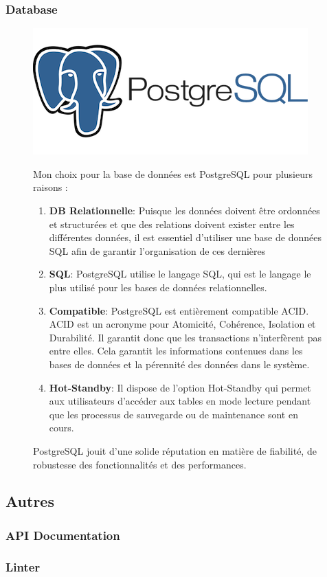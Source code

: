 \subsubsection{Database}

\begin{figure}[H]
  \begin{minipage}{.3\textwidth}
    \includegraphics[width=0.75\linewidth]{img/tech/PostgreSql.png} 
  \end{minipage} 
  \begin{minipage}{.7\textwidth}
    Mon choix pour la base de données est PostgreSQL pour plusieurs raisons :
    \begin{enumerate}
      \item \textbf{DB Relationnelle}: Puisque les données doivent être ordonnées et structurées et que des relations doivent exister entre les différentes données, il est essentiel d'utiliser une base de données SQL afin de garantir l'organisation de ces dernières
      \item \textbf{SQL}: PostgreSQL utilise le langage SQL, qui est le langage le plus utilisé pour les bases de données relationnelles.
      \item \textbf{Compatible}: PostgreSQL est entièrement compatible ACID. ACID est un acronyme pour Atomicité, Cohérence, Isolation et Durabilité. Il garantit donc que les transactions n'interfèrent pas entre elles. Cela garantit les informations contenues dans les bases de données et la pérennité des données dans le système.
      \item \textbf{Hot-Standby}: Il dispose de l'option Hot-Standby qui permet aux utilisateurs d'accéder aux tables en mode lecture pendant que les processus de sauvegarde ou de maintenance sont en cours.

    \end{enumerate}
    PostgreSQL jouit d'une solide réputation en matière de fiabilité, de robustesse des fonctionnalités et des performances.
  \end{minipage} 
\end{figure}


  
\subsection{Autres}
\subsubsection{API Documentation}
\subsubsection{Linter}